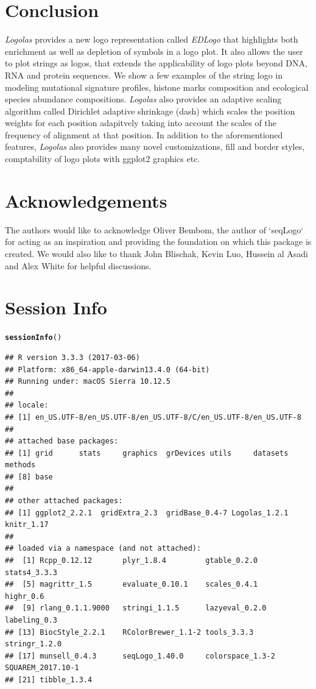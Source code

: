 \documentclass[12pt]{article}\usepackage[]{graphicx}\usepackage[usenames,dvipsnames]{color}
\makeatletter
\newcommand{\hlstd}[1]{\textcolor[rgb]{0.345,0.345,0.345}{#1}}%
\newcommand{\hlkwd}[1]{\textcolor[rgb]{0.737,0.353,0.396}{\textbf{#1}}}%
\newenvironment{kframe}{%
 \def\at@end@of@kframe{}%
 \ifinner\ifhmode%
  \def\at@end@of@kframe{\end{minipage}}%
  \begin{minipage}{\columnwidth}%
 \fi\fi%
 \def\FrameCommand##1{\hskip\@totalleftmargin \hskip-\fboxsep
 \colorbox{shadecolor}{##1}\hskip-\fboxsep
     \hskip-\linewidth \hskip-\@totalleftmargin \hskip\columnwidth}%
 \MakeFramed {\advance\hsize-\width
   \@totalleftmargin\z@ \linewidth\hsize
   \@setminipage}}%
 {\par\unskip\endMakeFramed%
 \at@end@of@kframe}
\newenvironment{knitrout}{}{} %
\newcommand{\Logolas}{\textit{Logolas}}
\makeatother
\begin{document}
\section{Conclusion}

\Logolas{} provides a new logo representation called \textit{EDLogo} that highlights both enrichment as well as depletion of symbols in a logo plot. It also allows the user to plot strings as logos, that extends the applicability of logo plots beyond DNA, RNA and protein sequences. We show a few examples of the string logo in modeling mutational signature profiles, histone marks composition and ecological species abundance compositions. \Logolas{} also provides an adaptive scaling algorithm called Dirichlet adaptive shrinkage (dash) which scales the position weights for each position adapitvely taking into account the scales of the frequency of alignment at that position. In addition to the aforementioned features, \Logolas{} also provides many novel customizations, fill and border styles, comptability of logo plots with ggplot2 graphics etc.

\section{Acknowledgements}

The authors would like to acknowledge Oliver Bembom, the author of `seqLogo` for acting as an inspiration and providing the foundation on which this package is created. We would also like to thank John Blischak, Kevin Luo, Hussein al Asadi and Alex White for helpful discussions.

\section{Session Info}

\begin{knitrout}
\color{fgcolor}\begin{kframe}
\begin{alltt}
\hlkwd{sessionInfo}\hlstd{()}
\end{alltt}
\begin{verbatim}
## R version 3.3.3 (2017-03-06)
## Platform: x86_64-apple-darwin13.4.0 (64-bit)
## Running under: macOS Sierra 10.12.5
## 
## locale:
## [1] en_US.UTF-8/en_US.UTF-8/en_US.UTF-8/C/en_US.UTF-8/en_US.UTF-8
## 
## attached base packages:
## [1] grid      stats     graphics  grDevices utils     datasets  methods  
## [8] base     
## 
## other attached packages:
## [1] ggplot2_2.2.1  gridExtra_2.3  gridBase_0.4-7 Logolas_1.2.1  knitr_1.17    
## 
## loaded via a namespace (and not attached):
##  [1] Rcpp_0.12.12       plyr_1.8.4         gtable_0.2.0       stats4_3.3.3      
##  [5] magrittr_1.5       evaluate_0.10.1    scales_0.4.1       highr_0.6         
##  [9] rlang_0.1.1.9000   stringi_1.1.5      lazyeval_0.2.0     labeling_0.3      
## [13] BiocStyle_2.2.1    RColorBrewer_1.1-2 tools_3.3.3        stringr_1.2.0     
## [17] munsell_0.4.3      seqLogo_1.40.0     colorspace_1.3-2   SQUAREM_2017.10-1 
## [21] tibble_1.3.4
\end{verbatim}
\end{kframe}
\end{knitrout}
\end{document}
